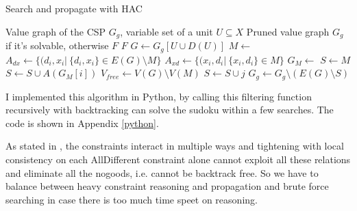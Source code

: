\documentclass[a4paper, 12pt]{report}
\begin{document}
            \begin{algorithm}
                \caption{Search and propagate with HAC}
                \label{HAC}
                \begin{algorithmic}[1]
                    \Require Value graph of the CSP $G_g$, variable set of a unit $U\subseteq X$
                    \Ensure Pruned value graph $G_g$ if it's solvable, otherwise $F$
                            \State \Return $F$
                        \EndIf
                        \State $G\leftarrow G_g[U\cup D(U)]$ 
                        \State $M\leftarrow$ 
                        \State $A_{dx}\leftarrow \{(d_i,x_i|\ \{d_i,x_i\}\in E(G)\setminus M \}$
                        \State $A_{xd}\leftarrow \{(x_i,d_i|\ \{x_i,d_i\}\in M\}$ 
                        \State $G_M\leftarrow$ 
                        \State $S\leftarrow M$
                            \State $S \leftarrow S\cup A(G_M[i])$
                        \EndFor
                        \State $V_{free} \leftarrow V(G)\setminus V(M)$
                             
                                    \State $S\leftarrow S\cup j$
                                \EndFor
                            \EndFor
                        \EndIf
                        \State $G_g\leftarrow G_g \setminus(E(G)\setminus S)$
                    \EndFunction
                \end{algorithmic}
            \end{algorithm}

            I implemented this algorithm in Python, by calling this filtering function recursively with backtracking can solve the sudoku within a few searches. The code is shown in Appendix \ref{python}.
                        

            As stated in \cite{simonis2005sudoku}, the constraints interact in multiple ways and tightening with local consistency on each AllDifferent constraint alone cannot exploit all these relations and eliminate all the nogoods, i.e. cannot be backtrack free. So we have to balance between heavy constraint reasoning and propagation and brute force searching in case there is too much time speet on reasoning.
\end{document}

